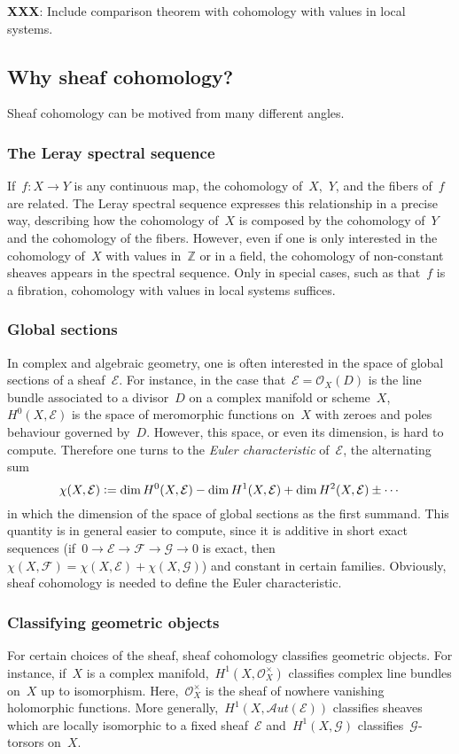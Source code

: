 \documentclass[10pt]{amsart}
\theoremstyle{definition}
\theoremstyle{plain}
\theoremstyle{remark}
\newcommand{\E}{\mathcal{E}}
\newcommand{\F}{\mathcal{F}}
\newcommand{\G}{\mathcal{G}}
\renewcommand{\O}{\mathcal{O}}
\newcommand{\ZZ}{\mathbb{Z}}
\newcommand{\defeq}{\vcentcolon=}
\begin{document}
\textbf{XXX}: Include comparison theorem with cohomology with values in local
systems.


\subsection{Why sheaf cohomology?}

Sheaf cohomology can be motived from many different angles.

\subsubsection*{The Leray spectral sequence} If~$f : X \to Y$ is any continuous map,
the cohomology of~$X$,~$Y$, and the fibers of~$f$ are related. The
Leray spectral sequence expresses this relationship in a precise way,
describing how the cohomology of~$X$ is composed by the cohomology of~$Y$ and
the cohomology of the fibers. However, even if one is only interested in the
cohomology of~$X$ with values in~$\ZZ$ or in a field, the cohomology of
non-constant sheaves appears in the spectral sequence. Only in special cases,
such as that~$f$ is a fibration, cohomology with values in local systems suffices.

\subsubsection*{Global sections} In complex and algebraic geometry, one is often
interested in the space of global sections of a sheaf~$\E$. For instance, in
the case that~$\E = \O_X(D)$ is the line bundle associated to a divisor~$D$ on a
complex manifold or scheme~$X$, $H^0(X,\E)$ is the space of meromorphic
functions on~$X$ with zeroes and poles behaviour governed by~$D$. However, this
space, or even its dimension, is hard to compute. Therefore one turns to the
\emph{Euler characteristic} of~$\E$, the alternating sum
\[ \chi(X,\E) \defeq \dim H^0(X,\E) - \dim H^1(X,\E) + \dim H^2(X,\E) \pm
\cdots \]
in which the dimension of the space of global sections as the first summand. This
quantity is in general easier to compute, since it is additive in short exact
sequences (if~$0 \to \E \to \F \to \G \to 0$ is exact, then~$\chi(X,\F) =
\chi(X,\E) + \chi(X,\G)$) and constant in certain families. Obviously,
sheaf cohomology is needed to define the Euler characteristic.

\subsubsection*{Classifying geometric objects} For certain choices of the sheaf, sheaf
cohomology classifies geometric objects. For instance, if~$X$ is a complex
manifold,~$H^1(X,\O_X^\times)$ classifies complex line bundles on~$X$ up to
isomorphism. Here,~$\O_X^\times$ is the sheaf of nowhere vanishing holomorphic
functions. More generally,~$H^1(X,\mathcal{A}ut(\E))$ classifies sheaves which
are locally isomorphic to a fixed sheaf~$\E$ and~$H^1(X,\G)$
classifies~$\G$-torsors on~$X$.
\end{document}
